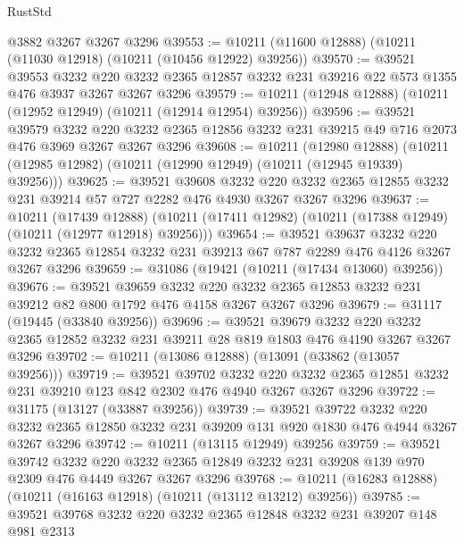 \begin{lexlean}{RustStd}
\begin{coremodule}
    @3882
    @3267
    @3267
    @3296
@39553 := @10211 (@11600 @12888) (@10211 (@11030 @12918) (@10211 (@10456 @12922) @39256))
@39570 := @39521
    @39553
    @3232
    @220
    @3232
    @2365
    @12857
    @3232
    @231
    @39216
    @22
    @573
    @1355
    @476
    @3937
    @3267
    @3267
    @3296
@39579 := @10211 (@12948 @12888) (@10211 (@12952 @12949) (@10211 (@12914 @12954) @39256))
@39596 := @39521
    @39579
    @3232
    @220
    @3232
    @2365
    @12856
    @3232
    @231
    @39215
    @49
    @716
    @2073
    @476
    @3969
    @3267
    @3267
    @3296
@39608 := @10211
    (@12980 @12888)
    (@10211 (@12985 @12982) (@10211 (@12990 @12949) (@10211 (@12945 @19339) @39256)))
@39625 := @39521
    @39608
    @3232
    @220
    @3232
    @2365
    @12855
    @3232
    @231
    @39214
    @57
    @727
    @2282
    @476
    @4930
    @3267
    @3267
    @3296
@39637 := @10211
    (@17439 @12888)
    (@10211 (@17411 @12982) (@10211 (@17388 @12949) (@10211 (@12977 @12918) @39256)))
@39654 := @39521
    @39637
    @3232
    @220
    @3232
    @2365
    @12854
    @3232
    @231
    @39213
    @67
    @787
    @2289
    @476
    @4126
    @3267
    @3267
    @3296
@39659 := @31086 (@19421 (@10211 (@17434 @13060) @39256))
@39676 := @39521
    @39659
    @3232
    @220
    @3232
    @2365
    @12853
    @3232
    @231
    @39212
    @82
    @800
    @1792
    @476
    @4158
    @3267
    @3267
    @3296
@39679 := @31117 (@19445 (@33840 @39256))
@39696 := @39521
    @39679
    @3232
    @220
    @3232
    @2365
    @12852
    @3232
    @231
    @39211
    @28
    @819
    @1803
    @476
    @4190
    @3267
    @3267
    @3296
@39702 := @10211 (@13086 @12888) (@13091 (@33862 (@13057 @39256)))
@39719 := @39521
    @39702
    @3232
    @220
    @3232
    @2365
    @12851
    @3232
    @231
    @39210
    @123
    @842
    @2302
    @476
    @4940
    @3267
    @3267
    @3296
@39722 := @31175 (@13127 (@33887 @39256))
@39739 := @39521
    @39722
    @3232
    @220
    @3232
    @2365
    @12850
    @3232
    @231
    @39209
    @131
    @920
    @1830
    @476
    @4944
    @3267
    @3267
    @3296
@39742 := @10211 (@13115 @12949) @39256
@39759 := @39521
    @39742
    @3232
    @220
    @3232
    @2365
    @12849
    @3232
    @231
    @39208
    @139
    @970
    @2309
    @476
    @4449
    @3267
    @3267
    @3296
@39768 := @10211 (@16283 @12888) (@10211 (@16163 @12918) (@10211 (@13112 @13212) @39256))
@39785 := @39521
    @39768
    @3232
    @220
    @3232
    @2365
    @12848
    @3232
    @231
    @39207
    @148
    @981
    @2313

\end{coremodule}
\end{lexlean}
